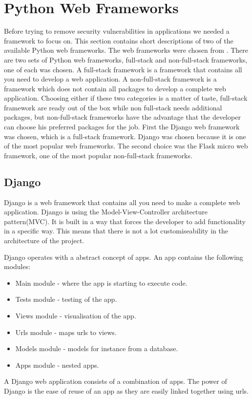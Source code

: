\section{Python Web Frameworks}
Before trying to remove security vulnerabilities in applications we needed a framework to focus on.
This section contains short descriptions of two of the available Python web frameworks.
The web frameworks were chosen from \citet{python_web_frameworks_list}.
There are two sets of Python web frameworks, full-stack and non-full-stack frameworks, one of each was chosen.
A full-stack framework is a framework that contains all you need to develop a web application.
A non-full-stack framework is a framework which does not contain all packages to develop a complete web application.
Choosing either if these two categories is a matter of taste, full-stack framework are ready out of the box while non full-stack needs additional packages, but non-full-stack frameworks have the advantage that the developer can choose his preferred packages for the job.
First the Django web framework was chosen, which is a full-stack framework.
Django was chosen because it is one of the most popular web frameworks.
The second choice was the Flask micro web framework, one of the most popular non-full-stack frameworks.

\subsection{Django}
Django\cite{django_cite} is a web framework that contains all you need to make a complete web application.
Django is using the Model-View-Controller architecture pattern(MVC)\cite{leff2001web}.
It is built in a way that forces the developer to add functionality in a specific way.
This means that there is not a lot customiseability in the architecture of the project.

Django operates with a abstract concept of apps.
An app contains the following modules:
\begin{itemize}
\item Main module - where the app is starting to execute code.
\item Tests module - testing of the app.
\item Views module - visualisation of the app.
\item Urls module - maps urls to views.
\item Models module - models for instance from a database.
\item Apps module - nested apps.
\end{itemize}
A Django web application consists of a combination of apps.
The power of Django is the ease of reuse of an app as they are easily linked together using urls.

